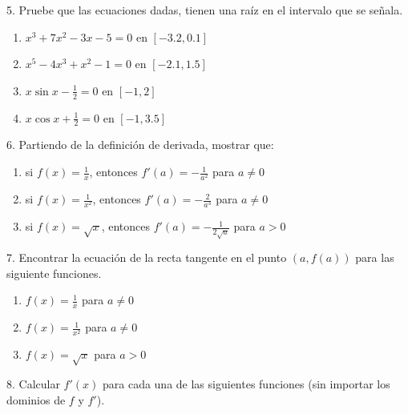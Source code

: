 \documentclass[12pt]{article}
\begin{document}
5. Pruebe que las ecuaciones dadas, tienen una raíz en el intervalo que se señala.

\begin{enumerate}[\hspace{9px} a)]
    \item \(x^3+7x^2-3x-5=0\) en $[-3.2,0.1]$
    \item \(x^5-4x^3+x^2-1=0\) en $[-2.1,1.5]$
    \item \(x\sin x-\displaystyle\frac{1}{2}=0\) en $[-1,2]$
    \item \(x\cos x+\displaystyle\frac{1}{2}=0\) en $[-1,3.5]$
\end{enumerate}

6. Partiendo de la definición de derivada, mostrar que:

\begin{enumerate}[\hspace{9px} a)]
    \item si \(f(x)=\displaystyle\frac{1}{x}\), entonces \(f'(a)=-\displaystyle\frac{1}{a^2}\) para \(a \neq 0\)
    \item si \(f(x)=\displaystyle\frac{1}{x^2}\), entonces \(f'(a)=-\displaystyle\frac{2}{a^3}\) para \(a \neq 0\)
    \item si \(f(x)=\sqrt{x}\), entonces \(f'(a)=-\displaystyle\frac{1}{2\sqrt{a}}\) para \(a > 0\)
\end{enumerate}

7. Encontrar la ecuación de la recta tangente en el punto \((a,f(a))\) para las siguiente funciones.

\begin{enumerate}[\hspace{9px} a)]
    \item \(f(x)=\displaystyle\frac{1}{x}\) para \(a \neq 0\)
    \item \(f(x)=\displaystyle\frac{1}{x^2}\) para \(a \neq 0\)
    \item \(f(x)=\sqrt{x}\) para \(a > 0\)
\end{enumerate}

8. Calcular \(f'(x)\) para cada una de las siguientes funciones (sin importar los dominios de \(f\) y \(f'\)).
\end{document}
